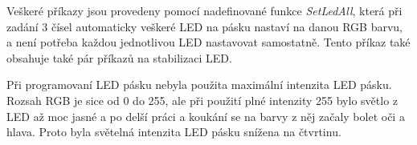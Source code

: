 Veškeré příkazy jsou provedeny pomocí nadefinované funkce \textit{SetLedAll}, která při zadání 3 čísel automaticky veškeré LED na pásku nastaví na danou RGB barvu, a není potřeba každou jednotlivou LED nastavovat samostatně. Tento příkaz také obsahuje také pár příkazů na stabilizaci LED.

Při programovaní LED pásku nebyla použita maximální intenzita LED pásku. Rozsah RGB je sice od 0 do 255, ale při použití plné intenzity 255 bylo světlo z LED až moc jasné a po delší práci a koukání se na barvy z něj začaly bolet oči a hlava. Proto byla světelná intenzita LED pásku snížena na čtvrtinu. 
\newpage